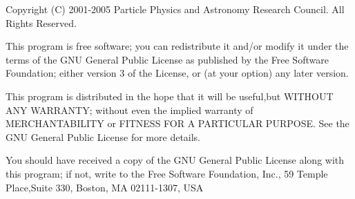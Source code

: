 Copyright (C) 2001-2005 Particle Physics and Astronomy Research
Council. All Rights Reserved.



This program is free software; you can redistribute it and/or modify it under
the terms of the GNU General Public License as published by the Free Software
Foundation; either version 3 of the License, or (at your option) any later
version.



This program is distributed in the hope that it will be useful,but WITHOUT ANY
WARRANTY; without even the implied warranty of MERCHANTABILITY or FITNESS FOR A
PARTICULAR PURPOSE. See the GNU General Public License for more details.



You should have received a copy of the GNU General Public License along with
this program; if not, write to the Free Software Foundation, Inc., 59 Temple
Place,Suite 330, Boston, MA  02111-1307, USA


